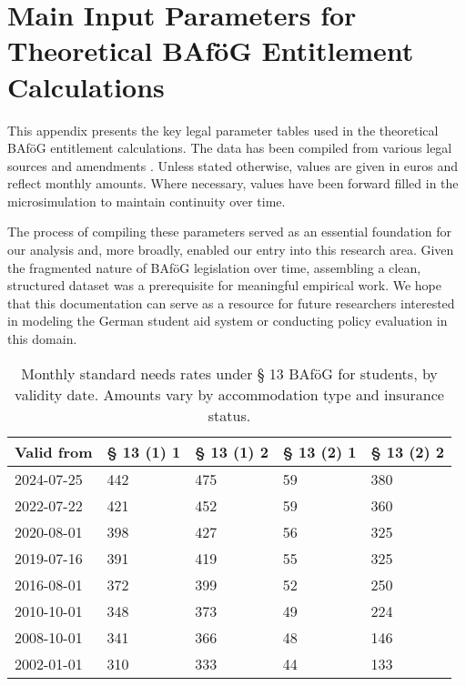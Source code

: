 \newpage
\section{Main Input Parameters for Theoretical BAföG Entitlement Calculations}

This appendix presents the key legal parameter tables used in the theoretical BAföG entitlement calculations. 
The data has been compiled from various legal sources and amendments \cite{bafoeg_law, bafoeg20, bafoeg21, bafoeg22, bafoeg23, bafoeg24, bafoeg25, bafoeg26, bafoeg27, bafoeg28}. 
Unless stated otherwise, values are given in euros and reflect monthly amounts. Where necessary, values have been forward filled in the microsimulation to maintain continuity over time.

The process of compiling these parameters served as an essential foundation for our analysis and, more broadly, enabled our entry into this research area. 
Given the fragmented nature of BAföG legislation over time, assembling a clean, structured dataset was a prerequisite for meaningful empirical work. 
We hope that this documentation can serve as a resource for future researchers interested in modeling the German student aid system or conducting policy evaluation in this domain.

\vspace{1em}

\begin{table}[H]
\centering
\small
\begin{tabularx}{\textwidth}{lXXXX}
\toprule
\textbf{Valid from} & \textbf{§ 13 (1) 1} & \textbf{§ 13 (1) 2} & \textbf{§ 13 (2) 1} & \textbf{§ 13 (2) 2} \\
\midrule
2024-07-25 & 442 & 475 & 59 & 380 \\
2022-07-22 & 421 & 452 & 59 & 360 \\
2020-08-01 & 398 & 427 & 56 & 325 \\
2019-07-16 & 391 & 419 & 55 & 325 \\
2016-08-01 & 372 & 399 & 52 & 250 \\
2010-10-01 & 348 & 373 & 49 & 224 \\
2008-10-01 & 341 & 366 & 48 & 146 \\
2002-01-01 & 310 & 333 & 44 & 133 \\
\bottomrule
\end{tabularx}
\caption{Monthly standard needs rates under § 13 BAföG for students, by validity date. Amounts vary by accommodation type and insurance status.}
\label{tab:bafog_values_13}
\end{table}

